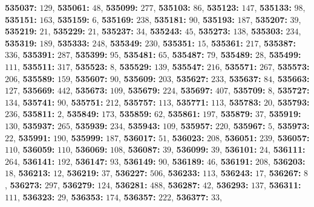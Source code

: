 \textsf{\bfseries 535037:} $129$, \textsf{\bfseries 535061:} $48$, \textsf{\bfseries 535099:} $277$, \textsf{\bfseries 535103:} $86$, \textsf{\bfseries 535123:} $147$, \textsf{\bfseries 535133:} $98$, \textsf{\bfseries 535151:} $163$, \textsf{\bfseries 535159:} $6$, \textsf{\bfseries 535169:} $238$, \textsf{\bfseries 535181:} $90$, \textsf{\bfseries 535193:} $187$, \textsf{\bfseries 535207:} $39$, \textsf{\bfseries 535219:} $21$, \textsf{\bfseries 535229:} $21$, \textsf{\bfseries 535237:} $34$, \textsf{\bfseries 535243:} $45$, \textsf{\bfseries 535273:} $138$, \textsf{\bfseries 535303:} $234$, \textsf{\bfseries 535319:} $189$, \textsf{\bfseries 535333:} $248$, \textsf{\bfseries 535349:} $230$, \textsf{\bfseries 535351:} $15$, \textsf{\bfseries 535361:} $217$, \textsf{\bfseries 535387:} $336$, \textsf{\bfseries 535391:} $287$, \textsf{\bfseries 535399:} $95$, \textsf{\bfseries 535481:} $65$, \textsf{\bfseries 535487:} $79$, \textsf{\bfseries 535489:} $28$, \textsf{\bfseries 535499:} $111$, \textsf{\bfseries 535511:} $317$, \textsf{\bfseries 535523:} $8$, \textsf{\bfseries 535529:} $139$, \textsf{\bfseries 535547:} $216$, \textsf{\bfseries 535571:} $267$, \textsf{\bfseries 535573:} $206$, \textsf{\bfseries 535589:} $159$, \textsf{\bfseries 535607:} $90$, \textsf{\bfseries 535609:} $203$, \textsf{\bfseries 535627:} $233$, \textsf{\bfseries 535637:} $84$, \textsf{\bfseries 535663:} $127$, \textsf{\bfseries 535669:} $442$, \textsf{\bfseries 535673:} $109$, \textsf{\bfseries 535679:} $224$, \textsf{\bfseries 535697:} $407$, \textsf{\bfseries 535709:} $8$, \textsf{\bfseries 535727:} $134$, \textsf{\bfseries 535741:} $90$, \textsf{\bfseries 535751:} $212$, \textsf{\bfseries 535757:} $113$, \textsf{\bfseries 535771:} $113$, \textsf{\bfseries 535783:} $20$, \textsf{\bfseries 535793:} $236$, \textsf{\bfseries 535811:} $2$, \textsf{\bfseries 535849:} $173$, \textsf{\bfseries 535859:} $62$, \textsf{\bfseries 535861:} $197$, \textsf{\bfseries 535879:} $37$, \textsf{\bfseries 535919:} $130$, \textsf{\bfseries 535937:} $265$, \textsf{\bfseries 535939:} $234$, \textsf{\bfseries 535943:} $109$, \textsf{\bfseries 535957:} $220$, \textsf{\bfseries 535967:} $5$, \textsf{\bfseries 535973:} $22$, \textsf{\bfseries 535991:} $190$, \textsf{\bfseries 535999:} $187$, \textsf{\bfseries 536017:} $51$, \textsf{\bfseries 536023:} $208$, \textsf{\bfseries 536051:} $239$, \textsf{\bfseries 536057:} $110$, \textsf{\bfseries 536059:} $110$, \textsf{\bfseries 536069:} $108$, \textsf{\bfseries 536087:} $39$, \textsf{\bfseries 536099:} $39$, \textsf{\bfseries 536101:} $24$, \textsf{\bfseries 536111:} $264$, \textsf{\bfseries 536141:} $192$, \textsf{\bfseries 536147:} $93$, \textsf{\bfseries 536149:} $90$, \textsf{\bfseries 536189:} $46$, \textsf{\bfseries 536191:} $208$, \textsf{\bfseries 536203:} $18$, \textsf{\bfseries 536213:} $12$, \textsf{\bfseries 536219:} $37$, \textsf{\bfseries 536227:} $506$, \textsf{\bfseries 536233:} $113$, \textsf{\bfseries 536243:} $17$, \textsf{\bfseries 536267:} $8$, \textsf{\bfseries 536273:} $297$, \textsf{\bfseries 536279:} $124$, \textsf{\bfseries 536281:} $488$, \textsf{\bfseries 536287:} $42$, \textsf{\bfseries 536293:} $137$, \textsf{\bfseries 536311:} $111$, \textsf{\bfseries 536323:} $29$, \textsf{\bfseries 536353:} $174$, \textsf{\bfseries 536357:} $222$, \textsf{\bfseries 536377:} $33$, 
